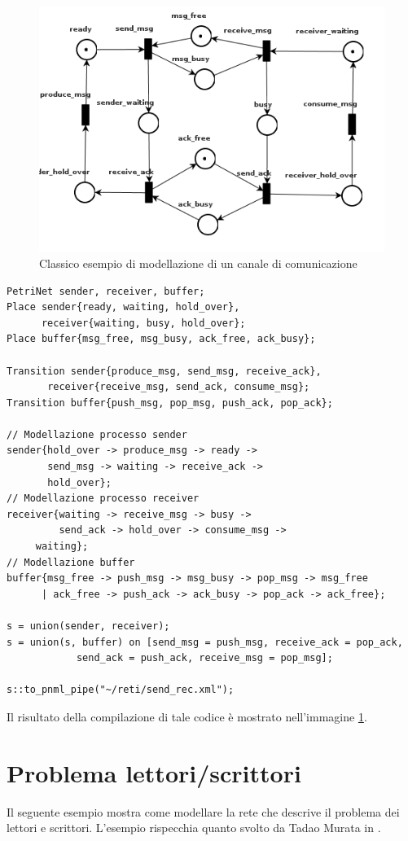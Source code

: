 \documentclass[italian,12pt]{book}
\begin{document}
\begin{figure}[htb]
\centerline{\includegraphics[width=12cm, height=8cm]{img/send_rec.png}}
\caption{Classico esempio di modellazione di un canale di comunicazione}\label{fig:send_rec.png}
\end{figure}

\begin{verbatim}PetriNet sender, receiver, buffer;
Place sender{ready, waiting, hold_over}, 
      receiver{waiting, busy, hold_over};
Place buffer{msg_free, msg_busy, ack_free, ack_busy};

Transition sender{produce_msg, send_msg, receive_ack}, 
	   receiver{receive_msg, send_ack, consume_msg};
Transition buffer{push_msg, pop_msg, push_ack, pop_ack};

// Modellazione processo sender
sender{hold_over -> produce_msg -> ready -> 
       send_msg -> waiting -> receive_ack -> 
       hold_over};
// Modellazione processo receiver
receiver{waiting -> receive_msg -> busy -> 
         send_ack -> hold_over -> consume_msg -> 
	 waiting};
// Modellazione buffer
buffer{msg_free -> push_msg -> msg_busy -> pop_msg -> msg_free 
      | ack_free -> push_ack -> ack_busy -> pop_ack -> ack_free};

s = union(sender, receiver);
s = union(s, buffer) on [send_msg = push_msg, receive_ack = pop_ack, 
			send_ack = push_ack, receive_msg = pop_msg];

s::to_pnml_pipe("~/reti/send_rec.xml");
\end{verbatim}

Il risultato della compilazione di tale codice è mostrato nell'immagine \ref{fig:send_rec.png}.

\section{Problema lettori/scrittori}
Il seguente esempio mostra come modellare la rete che descrive il problema dei lettori e scrittori. L'esempio rispecchia quanto svolto da Tadao Murata in \cite{MURATA}.
\end{document}
